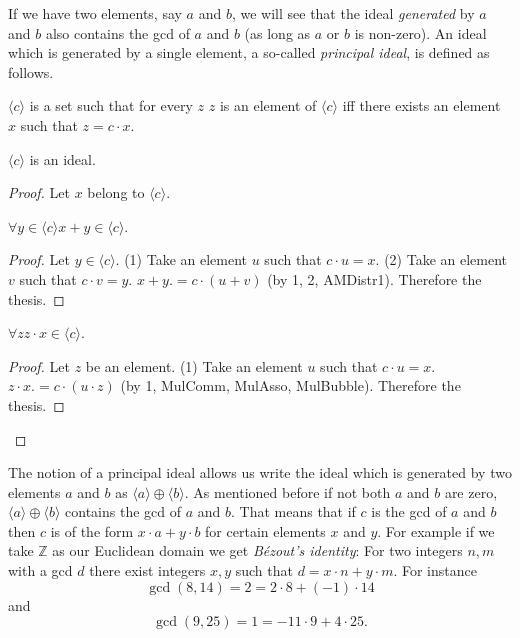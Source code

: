 \documentclass{article}
\newcommand{\Int}{\mathbb{Z}}
\begin{document}
  If we have two elements, say $a$ and $b$, we will see that the ideal
  \textit{generated} by $a$ and $b$ also contains the gcd of $a$ and $b$ (as
  long as $a$ or $b$ is non-zero). An ideal which is generated by a single
  element, a so-called \textit{principal ideal}, is defined as follows.

  \begin{forthel}
    \begin{definition}\label{DefPrIdeal}
      $\langle c \rangle$ is a set such that for every $z$ $z$ is an element of
      $\langle c \rangle$ iff there exists an element $x$ such that
      $z = c \cdot x$.
    \end{definition}

    \begin{lemma}\label{PrIdeal}
      $\langle c \rangle$ is an ideal.
    \end{lemma}
    \begin{proof}
      Let $x$ belong to $\langle c \rangle$.

      $\forall y \in \langle c \rangle x + y \in \langle c \rangle$.
      \begin{proof}
        Let $y \in \langle c \rangle$.
        (1) Take an element $u$ such that $c \cdot u = x$.
        (2) Take an element $v$ such that $c \cdot v = y$.
        $x + y .= c \cdot (u + v)$ (by 1, 2, AMDistr1).
        Therefore the thesis.
      \end{proof}

      $\forall z z \cdot x \in \langle c \rangle$.
      \begin{proof}
        Let $z$ be an element.
        (1) Take an element $u$ such that $c \cdot u = x$.
        $z \cdot x .= c \cdot (u \cdot z)$ (by 1, MulComm, MulAsso, MulBubble).
        Therefore the thesis.
      \end{proof}
    \end{proof}
  \end{forthel}

  The notion of a principal ideal allows us write the ideal which is generated
  by two elements $a$ and $b$ as $\langle a \rangle \oplus \langle b \rangle$.
  As mentioned before if not both $a$ and $b$ are zero,
  $\langle a \rangle \oplus \langle b \rangle$ contains the gcd of $a$ and $b$.
  That means that if $c$ is the gcd of $a$ and $b$ then $c$ is of the form
  $x \cdot a + y \cdot b$ for certain elements $x$ and $y$. For example if we
  take $\Int$ as our Euclidean domain we get \textit{Bézout's identity}: For two
  integers $n,m$ with a gcd $d$ there exist integers $x,y$ such that
  $d = x \cdot n + y \cdot m$. For instance
  \[ \gcd(8,14) = 2 = 2 \cdot 8 + (-1) \cdot 14 \]
  and
  \[ \gcd(9,25) = 1 = -11 \cdot 9 + 4 \cdot 25. \]
\end{document}
